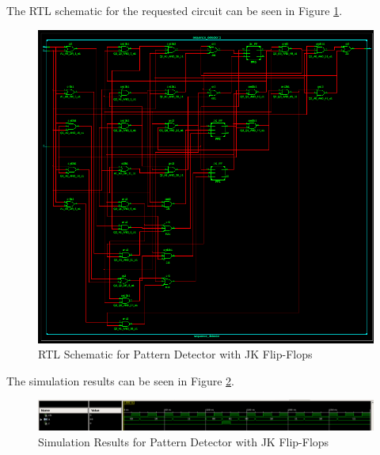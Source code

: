 \documentclass[table ]{article}
\begin{document}
The RTL schematic for the requested circuit can be seen in Figure \ref{fig:pattern_detector_jk_ff_rtl}.


\begin{figure}[H]
    \centering
    \includegraphics[width=\textwidth]{img/4/rtl.png}
    \caption{RTL Schematic for Pattern Detector with JK Flip-Flops}
    \label{fig:pattern_detector_jk_ff_rtl}
\end{figure}

The simulation results can be seen in Figure \ref{fig:pattern_detector_jk_ff_sim}.

\begin{figure}[H]
    \centering
    \includegraphics[width=\textwidth]{img/4/sim.png}
    \caption{Simulation Results for Pattern Detector with JK Flip-Flops}
    \label{fig:pattern_detector_jk_ff_sim}
\end{figure}
\end{document}
